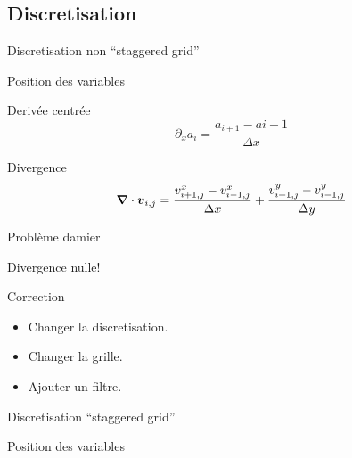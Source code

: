 \subsection{Discretisation}
\begin{frame}{Discretisation non  ``staggered grid''}
\begin{block}{Position des variables}
\shorthandoff{;:} 
\shorthandon{:;}
\end{block}
\begin{block}{Derivée centrée}
 \begin{equation*}
  \partial_x a_i=\frac{a_{i+1}-a{i-1}}{\Delta x}
\end{equation*}
\end{block}

\begin{block}{Divergence}
\begin{equation*}
  {\boldsymbol {\nabla}} \cdot {\boldsymbol {v}}_{i,j}=\frac{v^{x}_{i+1,j}-v^{x}_{i-1,j}}{\Delta x}+\frac{v^{y}_{i+1,j}-v^{y}_{i-1,j}}{\Delta y}
\end{equation*}
\end{block}
\end{frame}

\begin{frame}{Problème damier}
\begin{block}{Divergence nulle!}
\end{block}

\begin{block}{Correction}
 \begin{itemize}
  \item Changer la discretisation.
  \item Changer la grille.
  \item Ajouter un filtre.
 \end{itemize}

\end{block}

 
\end{frame}

\begin{frame}{Discretisation ``staggered grid''}
\begin{block}{Position des variables}
\shorthandoff{;:} 
 \shorthandon{:;}
\end{block}

 
\end{frame}

